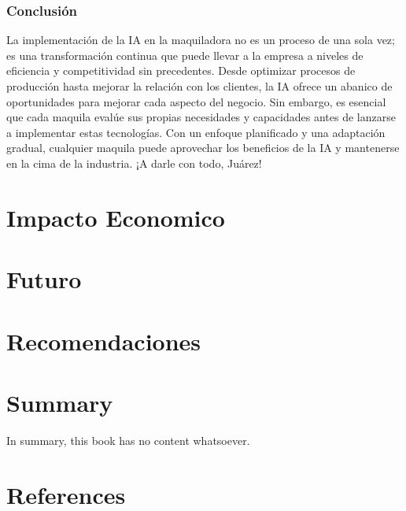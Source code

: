 \documentclass[
  letterpaper,
]{book}
\begin{document}
\subsection{Conclusión}\label{conclusiuxf3n}

La implementación de la IA en la maquiladora no es un proceso de una
sola vez; es una transformación continua que puede llevar a la empresa a
niveles de eficiencia y competitividad sin precedentes. Desde optimizar
procesos de producción hasta mejorar la relación con los clientes, la IA
ofrece un abanico de oportunidades para mejorar cada aspecto del
negocio. Sin embargo, es esencial que cada maquila evalúe sus propias
necesidades y capacidades antes de lanzarse a implementar estas
tecnologías. Con un enfoque planificado y una adaptación gradual,
cualquier maquila puede aprovechar los beneficios de la IA y mantenerse
en la cima de la industria. ¡A darle con todo, Juárez!


\chapter{Impacto Economico}\label{impacto-economico}


\chapter{Futuro}\label{futuro}


\chapter{Recomendaciones}\label{recomendaciones}


\chapter{Summary}\label{summary}

In summary, this book has no content whatsoever.


\chapter*{References}\label{references}
\end{document}

